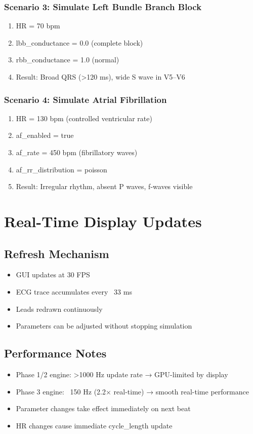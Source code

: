 \documentclass[11pt, a4paper]{article}
\begin{document}
\subsubsection{Scenario 3: Simulate Left Bundle Branch Block}
\begin{enumerate}
    \item HR = 70 bpm
    \item lbb\_conductance = 0.0 (complete block)
    \item rbb\_conductance = 1.0 (normal)
    \item Result: Broad QRS (>120 ms), wide S wave in V5--V6
\end{enumerate}

\subsubsection{Scenario 4: Simulate Atrial Fibrillation}
\begin{enumerate}
    \item HR = 130 bpm (controlled ventricular rate)
    \item af\_enabled = true
    \item af\_rate = 450 bpm (fibrillatory waves)
    \item af\_rr\_distribution = poisson
    \item Result: Irregular rhythm, absent P waves, f-waves visible
\end{enumerate}

\section{Real-Time Display Updates}

\subsection{Refresh Mechanism}
\begin{itemize}
    \item GUI updates at 30 FPS
    \item ECG trace accumulates every ~33 ms
    \item Leads redrawn continuously
    \item Parameters can be adjusted without stopping simulation
\end{itemize}

\subsection{Performance Notes}
\begin{itemize}
    \item Phase 1/2 engine: >1000 Hz update rate → GPU-limited by display
    \item Phase 3 engine: ~150 Hz (2.2× real-time) → smooth real-time performance
    \item Parameter changes take effect immediately on next beat
    \item HR changes cause immediate cycle\_length update
\end{itemize}
\end{document}

